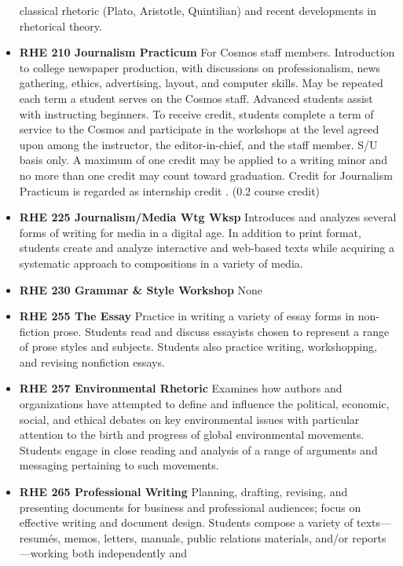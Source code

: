 \documentclass[
  letterpaper,
]{scrbook}
\begin{document}
\begin{itemize}
  classical rhetoric (Plato, Aristotle, Quintilian) and recent
  developments in rhetorical theory.\\
\item
  \textbf{RHE 210 Journalism Practicum} For Cosmos staff members.
  Introduction to college newspaper production, with discussions on
  professionalism, news gathering, ethics, advertising, layout, and
  computer skills. May be repeated each term a student serves on the
  Cosmos staff. Advanced students assist with instructing beginners. To
  receive credit, students complete a term of service to the Cosmos and
  participate in the workshops at the level agreed upon among the
  instructor, the editor-in-chief, and the staff member. S/U basis only.
  A maximum of one credit may be applied to a writing minor and no more
  than one credit may count toward graduation. Credit for Journalism
  Practicum is regarded as internship credit . (0.2 course credit)
\item
  \textbf{RHE 225 Journalism/Media Wtg Wksp} Introduces and analyzes
  several forms of writing for media in a digital age. In addition to
  print format, students create and analyze interactive and web-based
  texts while acquiring a systematic approach to compositions in a
  variety of media.\\
\item
  \textbf{RHE 230 Grammar \& Style Workshop} None
\item
  \textbf{RHE 255 The Essay} Practice in writing a variety of essay
  forms in non-fiction prose. Students read and discuss essayists chosen
  to represent a range of prose styles and subjects. Students also
  practice writing, workshopping, and revising nonfiction essays.\\
\item
  \textbf{RHE 257 Environmental Rhetoric} Examines how authors and
  organizations have attempted to define and influence the political,
  economic, social, and ethical debates on key environmental issues with
  particular attention to the birth and progress of global environmental
  movements. Students engage in close reading and analysis of a range of
  arguments and messaging pertaining to such movements.
\item
  \textbf{RHE 265 Professional Writing} Planning, drafting, revising,
  and presenting documents for business and professional audiences;
  focus on effective writing and document design. Students compose a
  variety of texts---resumés, memos, letters, manuals, public relations
  materials, and/or reports---working both independently and

\end{itemize}
\end{document}
